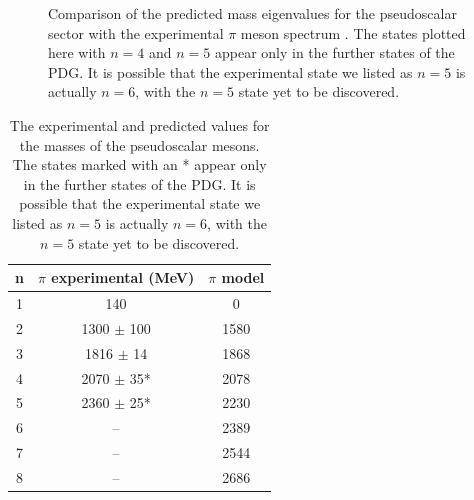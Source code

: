 \documentclass[aps,prd,12pt,nofootinbib]{revtex4}
\begin{document}
\begin{figure}[htb]
\caption{Comparison of the predicted mass eigenvalues for the pseudoscalar sector with the experimental $\pi$ meson spectrum \cite{PDG}.  The states plotted here with $n=4$ and $n=5$ appear only in the further states of the PDG.  It is possible that the experimental state we listed as $n=5$ is actually $n=6$, with the $n=5$ state yet to be discovered.}
\label{figPion}
\end{figure}

\begin{table}[htb]
\center
\begin{tabular}{| c || c | c  |}
\hline
n & $\pi$ experimental (MeV) & $\pi$ model \\
\hline
1 & 140 &				0 \\
2 & 1300 $\pm$ 100 & 	1580 \\
3 & 1816 $\pm$ 14&		1868 \\
4 & 2070 $\pm$ 35* & 	2078 \\ 
5 & 2360 $\pm$ 25* &	2230	\\
6 & -- & 				2389 \\
7 & -- & 				2544 \\
8 & -- &				2686 \\
\hline
\end{tabular}
\caption{The experimental \cite{PDG} and predicted values for the masses of the pseudoscalar mesons.  The states marked with an * appear only in the further states of the PDG.  It is possible that the experimental state we listed as $n=5$ is actually $n=6$, with the $n=5$ state yet to be discovered.}
\label{tabPion}
\end{table}
\end{document}
